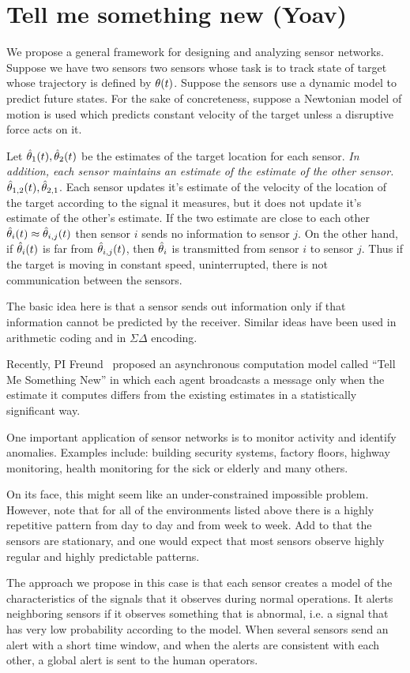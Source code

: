 \section{Tell me something new (Yoav)}
We propose a general framework for designing and analyzing sensor networks. Suppose we have two sensors two sensors whose task is to track state of target whose trajectory is defined by $\theta(t)$. Suppose the sensors use a dynamic model to predict future states. For the sake of concreteness, suppose a Newtonian model of motion is used which predicts constant velocity of the target unless a disruptive force acts on it.

Let $\hat{\theta}_1(t),\hat{\theta}_2(t)$ be the estimates of the target location for each sensor. {\em In addition, each sensor maintains an estimate of the estimate of the other sensor.} $\hat{\theta}_{1,2}(t),\hat{\theta}_{2,1}$. Each sensor updates it's estimate of the velocity of the location of the target according to the signal it measures, but it does not update it's estimate of the other's estimate.  If the two estimate are close to each other $\hat{\theta}_i(t) \approx \hat{\theta}_{i,j}(t)$ then sensor $i$ sends no information to sensor $j$. On the other hand, if $\hat{\theta}_i(t)$ is far from $\hat{\theta}_{i,j}(t)$, then $\hat{\theta}_{i}$ is transmitted from sensor 
$i$ to sensor $j$. Thus if the target is moving in constant speed, uninterrupted, there is not communication between the sensors.

The basic idea here is that a sensor sends out information only if
that information cannot be predicted by the receiver. Similar ideas
have been used in arithmetic coding and  in
$\Sigma\Delta$ encoding.

Recently, PI Freund~\cite{TMSN} proposed an asynchronous computation
model called ``Tell Me Something New'' in which each agent broadcasts
a message only when the estimate it computes differs from the existing
estimates in a statistically significant way.

 One important application of sensor networks is to monitor activity
 and identify anomalies. Examples include: building security systems,
 factory floors, highway monitoring, health monitoring for the sick or
 elderly and many others.

 On its face, this might seem like an under-constrained impossible
 problem. However, note that for all of the environments listed above
 there is a highly repetitive pattern from day to day and from week to
 week. Add to that the sensors are stationary, and one would expect
 that most sensors observe highly regular and highly predictable
 patterns.
 
 The approach we propose in this case is that each sensor creates a
 model of the characteristics of the signals that it observes during
 normal operations. It alerts neighboring sensors if it observes
 something that is abnormal, i.e. a signal that has very low
 probability according to the model. When several sensors send an
 alert with a short time window, and when the alerts are consistent
 with each other, a global alert is sent to the human operators.

